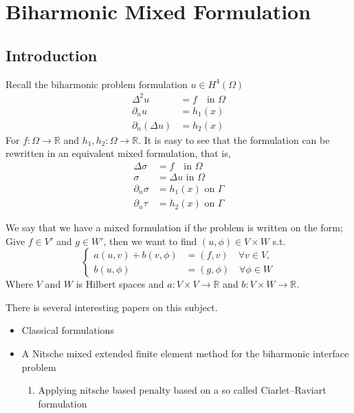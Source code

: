 
\newpage
\section{Biharmonic Mixed Formulation}%
\label{sec:biharmonic_mixed_formulation}


\subsection{Introduction}%
\label{sub:introduction}

Recall the biharmonic problem formulation $u \in H^4( \Omega ) $  \[
    \begin{split}
\Delta ^2 u & = f \quad  \text{in } \Omega \\
\partial _{n} u & = h_{1}(x ) \\
\partial _{n}( \Delta u)  & = h_{2}( x)
    \end{split}
\]
For $f: \Omega  \to  \mathbb{R} $ and $h_{1},h_{2}: \Omega  \to \mathbb{R}  $. It is easy to see
that the formulation can be rewritten in an equivalent mixed formulation, that is, \[
    \begin{split}
\Delta \sigma  & = f \quad  \text{in } \Omega \\
\sigma   & = \Delta u  \text{ in } \Omega \\
\partial _{n} \sigma  & = h_{1}(x ) \text{ on } \Gamma  \\
\partial _{n} \tau   & = h_{2}( x) \text{ on } \Gamma
    \end{split}
\]



We say that we have a mixed formulation if the problem is written on the form; Give $f \in V' $  and $g \in W' $, then we want to find $( u, \phi ) \in V \times W$  s.t. \[
    \begin{cases}
       a( u,v) + b ( v, \phi )  & = ( f,v)  \quad  \forall v \in V, \\
       b( u, \phi )  & = ( g, \phi )    \quad \forall \phi \in W
    \end{cases}
\]
Where $V$  and $W$  is Hilbert spaces and $a: V\times V \to \mathbb{R}  $ and $b: V \times W \to \mathbb{R} $.

There is several interesting papers on this subject.
\begin{itemize}
    \item Classical formulations \cite{babuvska1980analysis}
    \item  A Nitsche mixed extended finite element method for the biharmonic interface problem \cite{cai2023nitsche}
        \begin{enumerate}[label=\arabic*)]
            \item Applying nitsche based penalty based on a so called Ciarlet–Raviart formulation
        \end{enumerate}
\end{itemize}






